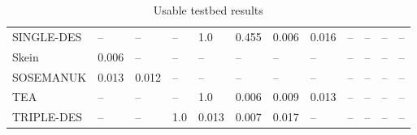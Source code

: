 \documentclass[twoside,a4paper]{article}
\begin{document}
\begin{table}[H]
\begin{tabular}{l|l l l l l l l l l l l}
SINGLE-DES   & \fd{}--    & \fd{}--    & \fd{}--    & \fd{}1.0   & \fd{}0.455 & \fn{}0.006 & \fn{}0.016 & \fn{}--    & \fn{}--    & \fn{}--    & \fn{}--   \\
Skein        & \fn{}0.006 & \fn{}--    & \fn{}--    & \fn{}--    & \fn{}--    & \fn{}--    & \fn{}--    & \fn{}--    & \fn{}--    & \fn{}--    & \fn{}--   \\
SOSEMANUK    & \fn{}0.013 & \fn{}0.012 & \fn{}--    & \fn{}--    & \fn{}--    & \fn{}--    & \fn{}--    & \fn{}--    & \fn{}--    & \fn{}--    & \fn{}--   \\
TEA          & \fd{}--    & \fd{}--    & \fd{}--    & \fd{}1.0   & \fn{}0.006 & \fn{}0.009 & \fn{}0.013 & \fn{}--    & \fn{}--    & \fn{}--    & \fn{}--   \\
TRIPLE-DES   & \fd{}--    & \fd{}--    & \fd{}1.0   & \fn{}0.013 & \fn{}0.007 & \fn{}0.017 & \fn{}--    & \fn{}--    & \fn{}--    & \fn{}--    & \fn{}--   
\end{tabular}
\caption{Usable testbed results}
\end{table}
\end{document}
